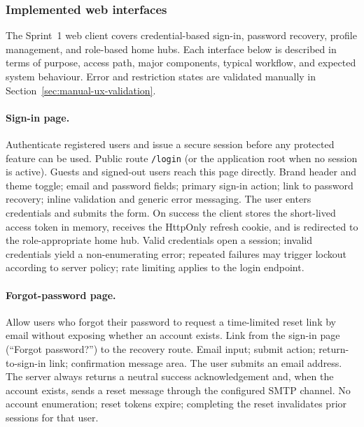 \subsubsection{Implemented web interfaces}
\label{subsubsec:impl-s1-ui}

The Sprint~1 web client covers credential-based sign-in, password recovery,
profile management, and role-based home hubs. Each interface below is described
in terms of purpose, access path, major components, typical workflow, and
expected system behaviour. Error and restriction states are validated manually in
Section~\ref{sec:manual-ux-validation}.

\paragraph{Sign-in page.}
\uiexplain
{Authenticate registered users and issue a secure session before any protected
feature can be used.}
{Public route \texttt{/login} (or the application root when no session is
active). Guests and signed-out users reach this page directly.}
{Brand header and theme toggle; email and password fields; primary sign-in
action; link to password recovery; inline validation and generic error messaging.}
{The user enters credentials and submits the form. On success the client stores
the short-lived access token in memory, receives the HttpOnly refresh cookie, and
is redirected to the role-appropriate home hub.}
{Valid credentials open a session; invalid credentials yield a non-enumerating
error; repeated failures may trigger lockout according to server policy; rate
limiting applies to the login endpoint.}

\paragraph{Forgot-password page.}
\uiexplain
{Allow users who forgot their password to request a time-limited reset link by
email without exposing whether an account exists.}
{Link from the sign-in page (``Forgot password?'') to the recovery route.}
{Email input; submit action; return-to-sign-in link; confirmation message area.}
{The user submits an email address. The server always returns a neutral success
acknowledgement and, when the account exists, sends a reset message through the
configured SMTP channel.}
{No account enumeration; reset tokens expire; completing the reset invalidates
prior sessions for that user.}

